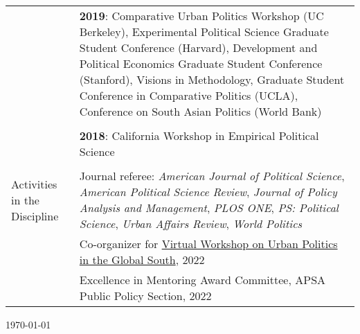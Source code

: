 \documentclass[letterpaper, 11pt]{article}
\begin{document}
\begin{longtable}{p{1in}p{5.5in}}
 &\textbf{2019}: Comparative Urban Politics Workshop (UC Berkeley), Experimental Political Science Graduate Student Conference (Harvard), Development and Political Economics Graduate Student Conference (Stanford), Visions in Methodology, Graduate Student Conference in Comparative Politics (UCLA), Conference on South Asian Politics (World Bank)\\
 
 &\\
 &\textbf{2018}: California Workshop in Empirical Political Science
\\
 &\\
 

 

\nohyphens{{Activities in the Discipline}}&Journal referee: \textit{American Journal of Political Science}, \textit{American Political Science Review}, \textit{Journal of Policy Analysis and Management}, \textit{PLOS ONE}, \textit{PS: Political Science}, \textit{Urban Affairs Review}, \textit{World Politics}\\ 
 & Co-organizer for \href{https://www.globalsouthurbanpols.com}{Virtual Workshop on Urban Politics in the Global South}, 2022\\


&Excellence in Mentoring Award Committee, APSA Public Policy Section, 2022 \\






\end{longtable}
\vspace*{\fill}
\flushright \monthyeardate\today 
\end{document}
